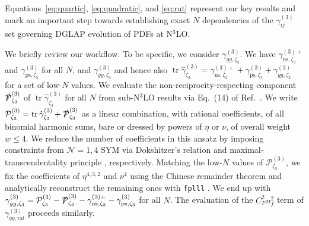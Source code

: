 \documentclass[
 twocolumn,
 superscriptaddress,
 preprintnumbers,
 nofootinbib,
 amsmath,amssymb,
 aps,
 prl
 ]{revtex4-2}
\newcommand{\tr}{\mathop{\mathrm{tr}}\nolimits}
\newcommand{\NP}{\slashed{\mathcal{P}}}
\begin{document}
Equations~\eqref{eq:quartic}, \eqref{eq:quadratic}, and \eqref{eq:rat} represent our key results and mark an important step towards establishing exact $N$ dependencies of the $\gamma_{ij}^{(3)}$ set governing DGLAP evolution of PDFs at N${}^3$LO.

We briefly review our workflow.
To be specific, we consider $\gamma_{gg,\zeta_3}^{(3)}$.
We have $\gamma_{\mathrm{ns},\zeta_3}^{(3)+}$ \cite{Kniehl:2025jfs,Kniehl:2026axe,Gehrmann:2026qbl} and $\gamma_{\mathrm{ps},\zeta_3}^{(3)}$ \cite{Falcioni:2025hfz} for all $N$, and $\gamma_{gg,\zeta_3}^{(3)}$ \cite{Moch:2021qrk,Moch:2023tdj,Falcioni:2024qpd,Falcioni:2025hfz} and hence also $\tr\hat{\gamma}_{\zeta_3}^{(3)}=\gamma_{\mathrm{ns},\zeta_3}^{(3)+}+\gamma_{\mathrm{ps},\zeta_3}^{(3)}+\gamma_{gg,\zeta_3}^{(3)}$ for a set of low-$N$ values.
We evaluate the non-reciprocity-respecting component $\NP_{\zeta_3}^{(3)}$ of $\tr\hat{\gamma}_{\zeta_3}^{(3)}$ for all $N$ from sub-N${}^3$LO results via Eq.~(14) of Ref.~\cite{Kniehl:2026axe}.
We write $\mathcal{P}_{\zeta_3}^{(3)}=\tr\hat{\gamma}_{\zeta_3}^{(3)}+\NP_{\zeta_3}^{(3)}$ as a linear combination, with rational coefficients, of all binomial harmonic sums, bare or dressed by powers of $\eta$ or $\nu$, of overall weight $w\le4$.
We reduce the number of coefficients in this ansatz by imposing constraints from $\mathcal{N}=1,4$ SYM via Dokshitzer's relation \cite{Dokshitzer:1977sg,Bukhvostov:1985vj,Bukhvostov:1985rn,Belitsky:1998gu} and maximal-transcendentality principle \cite{Kotikov:2002ab,Kotikov:2006ts}, respectively.
Matching the low-$N$ values of $\mathcal{P}_{\zeta_3}^{(3)}$, we fix the coefficients of $\eta^{4,3,2}$ and $\nu^4$ using the Chinese remainder theorem \cite{china} and analytically reconstruct the remaining ones with \texttt{fplll} \cite{fplll}.
We end up with $\gamma_{gg,\zeta_3}^{(3)}=\mathcal{P}_{\zeta_3}^{(3)}-\NP_{\zeta_3}^{(3)}-\gamma_{\mathrm{ns},\zeta_3}^{(3)+}-\gamma_{\mathrm{ps},\zeta_3}^{(3)}$ for all $N$.
The evaluation of the $C_F^2n_f^2$ term of $\gamma_{gg,\mathrm{rat}}^{(3)}$ proceeds similarly.
\end{document}
